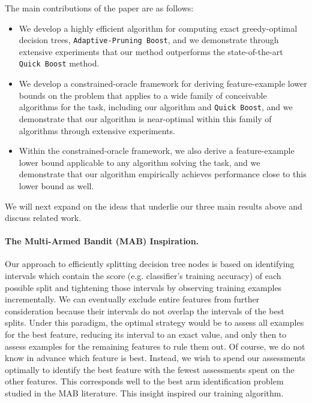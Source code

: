 The main contributions of the paper are as follows:\vspace{-0.5\baselineskip}
\begin{itemize}
\item We develop a highly efficient algorithm for computing exact
  greedy-optimal decision trees, \texttt{Adaptive-Pruning Boost}, and
  we demonstrate through extensive experiments that our method
  outperforms the state-of-the-art \texttt{Quick Boost} method.
\item We develop a constrained-oracle framework for deriving
  feature-example lower bounds on the problem that applies to a wide
  family of conceivable algorithms for the task, including our
  algorithm and \texttt{Quick Boost}, and we demonstrate that our
  algorithm is near-optimal within this family of algorithms through
  extensive experiments.
\item Within the constrained-oracle framework, we also derive a
  feature-example lower bound applicable to any algorithm solving the
  task, and we demonstrate that our algorithm empirically achieves
  performance close to this lower bound as well.
\end{itemize}

We will next expand on the ideas that underlie
our three main results above and discuss related work.

\paragraph{The Multi-Armed Bandit (MAB) Inspiration.}
Our approach to efficiently splitting decision tree nodes is based on
identifying intervals which contain the score (e.g. classifier's training accuracy) of each possible split and tightening those
intervals by observing training examples incrementally.
We can eventually exclude entire features
from further consideration because their intervals do not
overlap the intervals of the best splits.
Under this paradigm, the optimal strategy would be to assess all
examples for the best feature,
reducing its interval to an exact value,
and only then to assess examples for the remaining features
to rule them out.
Of course, we do not know in advance which feature is best.
Instead, we wish to spend our assessments optimally to identify the
best feature with the fewest assessments spent on the other features.
This corresponds well to the best arm identification problem studied
in the MAB literature. This insight inspired our training algorithm.


